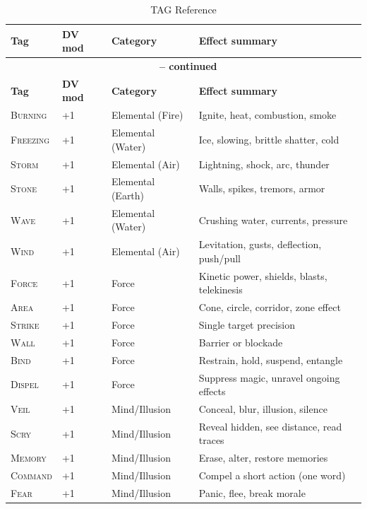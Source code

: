 \documentclass[10pt,a5paper]{book}
\newcommand{\tag}[1]{\textsc{#1}}
\begin{document}
\begin{longtable}{@{} p{2.5cm} p{1.2cm} p{2.5cm} p{6cm} @{}}
\caption{TAG Reference}\\
\toprule
\textbf{Tag} & \textbf{DV mod} & \textbf{Category} & \textbf{Effect summary} \\
\midrule
\endfirsthead
\multicolumn{4}{c}{{\bfseries \tablename\ \thetable{} -- continued}} \\
\toprule
\textbf{Tag} & \textbf{DV mod} & \textbf{Category} & \textbf{Effect summary} \\
\midrule
\endhead
\bottomrule
\endfoot

\tag{Burning} & +1 & Elemental (Fire) & Ignite, heat, combustion, smoke \\
\tag{Freezing} & +1 & Elemental (Water) & Ice, slowing, brittle shatter, cold \\
\tag{Storm} & +1 & Elemental (Air) & Lightning, shock, arc, thunder \\
\tag{Stone} & +1 & Elemental (Earth) & Walls, spikes, tremors, armor \\
\tag{Wave} & +1 & Elemental (Water) & Crushing water, currents, pressure \\
\tag{Wind} & +1 & Elemental (Air) & Levitation, gusts, deflection, push/pull \\
\midrule

\tag{Force} & +1 & Force & Kinetic power, shields, blasts, telekinesis \\
\tag{Area} & +1 & Force & Cone, circle, corridor, zone effect \\
\tag{Strike} & +1 & Force & Single target precision \\
\tag{Wall} & +1 & Force & Barrier or blockade \\
\tag{Bind} & +1 & Force & Restrain, hold, suspend, entangle \\
\tag{Dispel} & +1 & Force & Suppress magic, unravel ongoing effects \\
\midrule

\tag{Veil} & +1 & Mind/Illusion & Conceal, blur, illusion, silence \\
\tag{Scry} & +1 & Mind/Illusion & Reveal hidden, see distance, read traces \\
\tag{Memory} & +1 & Mind/Illusion & Erase, alter, restore memories \\
\tag{Command} & +1 & Mind/Illusion & Compel a short action (one word) \\
\tag{Fear} & +1 & Mind/Illusion & Panic, flee, break morale \\
\midrule


\end{longtable}
\end{document}
